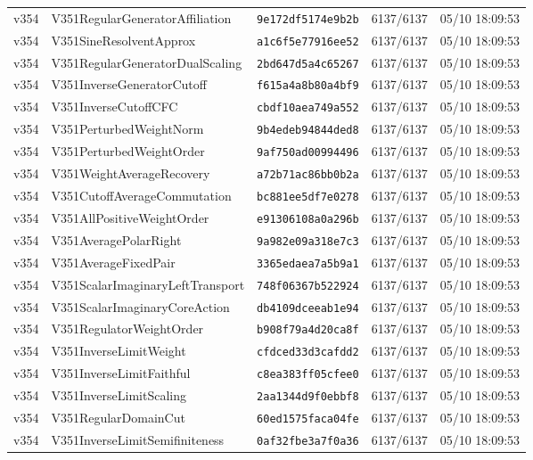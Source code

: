 \documentclass[11pt]{article}
\theoremstyle{definition}\newtheorem{deriv}{Derivação}
\begin{document}
{\begin{longtable}{@{}lllll@{}}
v354 & V351RegularGeneratorAffiliation & \texttt{9e172df5174e9b2b} & 6137/6137 & 05/10 18:09:53 \\
v354 & V351SineResolventApprox & \texttt{a1c6f5e77916ee52} & 6137/6137 & 05/10 18:09:53 \\
v354 & V351RegularGeneratorDualScaling & \texttt{2bd647d5a4c65267} & 6137/6137 & 05/10 18:09:53 \\
v354 & V351InverseGeneratorCutoff & \texttt{f615a4a8b80a4bf9} & 6137/6137 & 05/10 18:09:53 \\
v354 & V351InverseCutoffCFC & \texttt{cbdf10aea749a552} & 6137/6137 & 05/10 18:09:53 \\
v354 & V351PerturbedWeightNorm & \texttt{9b4edeb94844ded8} & 6137/6137 & 05/10 18:09:53 \\
v354 & V351PerturbedWeightOrder & \texttt{9af750ad00994496} & 6137/6137 & 05/10 18:09:53 \\
v354 & V351WeightAverageRecovery & \texttt{a72b71ac86bb0b2a} & 6137/6137 & 05/10 18:09:53 \\
v354 & V351CutoffAverageCommutation & \texttt{bc881ee5df7e0278} & 6137/6137 & 05/10 18:09:53 \\
v354 & V351AllPositiveWeightOrder & \texttt{e91306108a0a296b} & 6137/6137 & 05/10 18:09:53 \\
v354 & V351AveragePolarRight & \texttt{9a982e09a318e7c3} & 6137/6137 & 05/10 18:09:53 \\
v354 & V351AverageFixedPair & \texttt{3365edaea7a5b9a1} & 6137/6137 & 05/10 18:09:53 \\
v354 & V351ScalarImaginaryLeftTransport & \texttt{748f06367b522924} & 6137/6137 & 05/10 18:09:53 \\
v354 & V351ScalarImaginaryCoreAction & \texttt{db4109dceeab1e94} & 6137/6137 & 05/10 18:09:53 \\
v354 & V351RegulatorWeightOrder & \texttt{b908f79a4d20ca8f} & 6137/6137 & 05/10 18:09:53 \\
v354 & V351InverseLimitWeight & \texttt{cfdced33d3cafdd2} & 6137/6137 & 05/10 18:09:53 \\
v354 & V351InverseLimitFaithful & \texttt{c8ea383ff05cfee0} & 6137/6137 & 05/10 18:09:53 \\
v354 & V351InverseLimitScaling & \texttt{2aa1344d9f0ebbf8} & 6137/6137 & 05/10 18:09:53 \\
v354 & V351RegularDomainCut & \texttt{60ed1575faca04fe} & 6137/6137 & 05/10 18:09:53 \\
v354 & V351InverseLimitSemifiniteness & \texttt{0af32fbe3a7f0a36} & 6137/6137 & 05/10 18:09:53 \\

\end{longtable}}
\end{document}
